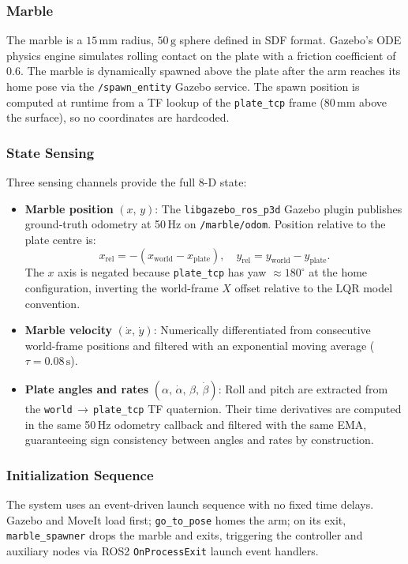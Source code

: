 \documentclass[journal]{IEEEtran}
\begin{document}
\subsubsection{Marble}
The marble is a $15\,\mathrm{mm}$ radius, $50\,\mathrm{g}$ sphere defined in SDF format. Gazebo's ODE
physics engine simulates rolling contact on the plate with a friction coefficient of 0.6. The marble is
dynamically spawned above the plate after the arm reaches its home pose via the \texttt{/spawn\_entity}
Gazebo service. The spawn position is computed at runtime from a TF lookup of the \texttt{plate\_tcp}
frame ($80\,\mathrm{mm}$ above the surface), so no coordinates are hardcoded.

\subsubsection{State Sensing}
Three sensing channels provide the full 8-D state:

\begin{itemize}
  \item \textbf{Marble position} $(x,\,y)$: The \texttt{libgazebo\_ros\_p3d} Gazebo plugin publishes
    ground-truth odometry at 50\,Hz on \texttt{/marble/odom}. Position relative to the plate centre is:
    \begin{equation}
      x_\mathrm{rel} = -(x_\mathrm{world} - x_\mathrm{plate}), \quad
      y_\mathrm{rel} =   y_\mathrm{world} - y_\mathrm{plate}.
      \label{eq:pos_rel}
    \end{equation}
    The $x$ axis is negated because \texttt{plate\_tcp} has yaw $\approx 180^\circ$ at the home
    configuration, inverting the world-frame $X$ offset relative to the LQR model convention.
  \item \textbf{Marble velocity} $(\dot{x},\,\dot{y})$: Numerically differentiated from consecutive
    world-frame positions and filtered with an exponential moving average ($\tau = 0.08\,\mathrm{s}$).
  \item \textbf{Plate angles and rates} $(\alpha,\,\dot{\alpha},\,\beta,\,\dot{\beta})$: Roll and pitch
    are extracted from the \texttt{world}$\,\to\,$\texttt{plate\_tcp} TF quaternion. Their time
    derivatives are computed in the same 50\,Hz odometry callback and filtered with the same EMA,
    guaranteeing sign consistency between angles and rates by construction.
\end{itemize}

\subsubsection{Initialization Sequence}
The system uses an event-driven launch sequence with no fixed time delays. Gazebo and MoveIt load first;
\texttt{go\_to\_pose} homes the arm; on its exit, \texttt{marble\_spawner} drops the marble and exits,
triggering the controller and auxiliary nodes via ROS2 \texttt{OnProcessExit} launch event handlers.
\end{document}
